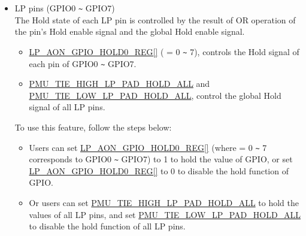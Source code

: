 \documentclass[main\_\_EN.tex]{subfiles}
\begin{document}
\begin{itemize}
To use this feature, follow the steps below:
    \begin{itemize}
        \item To maintain pin input/output status in Deep-sleep mode, users can set \hyperref[regdesc:LPAONGPIOHOLD0REG]{LP\_AON\_GPIO\_HOLD0\_REG[]} (where  = 8 \verb+~+ 30 corresponds to GPIO8 \verb+~+ GPIO30) to 1 before powering down. To disable the hold function after the chip is woken up, users can set  \hyperref[regdesc:LPAONGPIOHOLD0REG]{LP\_AON\_GPIO\_HOLD0\_REG[]} to 0. 
        \item Or users can set \hyperref[fielddesc:PMUTIEHIGHHPPADHOLDALL]{PMU\_TIE\_HIGH\_HP\_PAD\_HOLD\_ALL} to maintain the input/output status of all digital pins, and set \hyperref[fielddesc:PMUTIELOWHPPADHOLDALL]{PMU\_TIE\_LOW\_HP\_PAD\_HOLD\_ALL} to disable the hold function of all digital pins.
    \end{itemize}
\item LP pins (GPIO0 \verb+~+ GPIO7)\\
The Hold state of each LP pin is controlled by the result of OR operation of the pin's Hold enable signal and the global Hold enable signal.
\begin{itemize}
    \item \hyperref[regdesc:LPAONGPIOHOLD0REG]{LP\_AON\_GPIO\_HOLD0\_REG[]} ( = 0 \verb+~+ 7), controls the Hold signal of each pin of GPIO0 \verb+~+ GPIO7.
    \item \hyperref[fielddesc:PMUTIEHIGHLPPADHOLDALL]{PMU\_TIE\_HIGH\_LP\_PAD\_HOLD\_ALL} and \hyperref[fielddesc:PMUTIELOWLPPADHOLDALL]{PMU\_TIE\_LOW\_LP\_PAD\_HOLD\_ALL}, control the global Hold signal of all LP pins.
\end{itemize}
To use this feature, follow the steps below:
    \begin{itemize}
        \item Users can set  \hyperref[regdesc:LPAONGPIOHOLD0REG]{LP\_AON\_GPIO\_HOLD0\_REG[]} (where  = 0 \verb+~+ 7 corresponds to GPIO0 \verb+~+ GPIO7) to 1 to hold the value of GPIO, or set \hyperref[regdesc:LPAONGPIOHOLD0REG]{LP\_AON\_GPIO\_HOLD0\_REG[]} to 0 to disable the hold function of GPIO. 
        \item Or users can set \hyperref[fielddesc:PMUTIEHIGHLPPADHOLDALL]{PMU\_TIE\_HIGH\_LP\_PAD\_HOLD\_ALL} to hold the values of all LP pins, and set \hyperref[fielddesc:PMUTIELOWLPPADHOLDALL]{PMU\_TIE\_LOW\_LP\_PAD\_HOLD\_ALL} to disable the hold function of all LP pins.
    \end{itemize}
\end{itemize}
\end{document}
